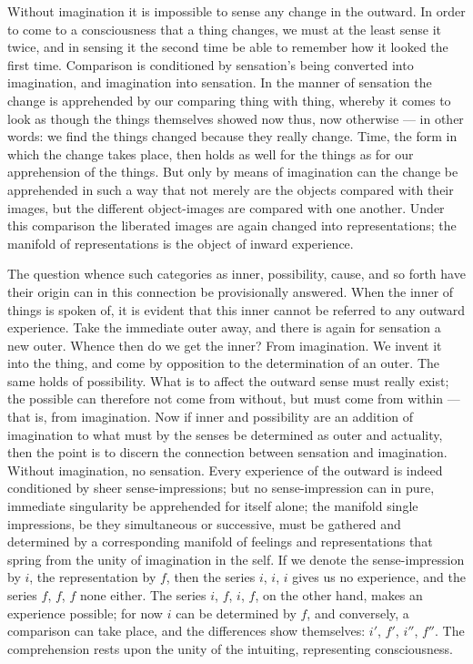 \documentclass[12pt]{book}
\begin{document}
Without imagination it is impossible to sense any change in the outward. In
order to come to a consciousness that a thing changes, we must at the least
sense it twice, and in sensing it the second time be able to remember how it
looked the first time. Comparison is conditioned by sensation's being
converted into imagination, and imagination into sensation. In the manner of
sensation the change is apprehended by our comparing thing with thing, whereby
it comes to look as though the things themselves showed now thus, now
otherwise --- in other words: we find the things changed because they really
change. Time, the form in which the change takes place, then holds as well for
the things as for our apprehension of the things. But only by means of
imagination can the change be apprehended in such a way that not merely are the
objects compared with their images, but the different object-images are
compared with one another. Under this comparison the liberated images are
again changed into representations; the manifold of representations is the
object of inward experience.

The question whence such categories as inner, possibility, cause, and so forth
have their origin can in this connection be provisionally answered. When the
inner of things is spoken of, it is evident that this inner cannot be referred
to any outward experience. Take the immediate outer away, and there is again
for sensation a new outer. Whence then do we get the inner? From imagination.
We invent it into the thing, and come by opposition to the determination of an
outer. The same holds of possibility. What is to affect the outward sense must
really exist; the possible can therefore not come from without, but must come
from within --- that is, from imagination. Now if inner and possibility are an
addition of imagination to what must by the senses be determined as outer and
actuality, then the point is to discern the connection between sensation and
imagination. Without imagination, no sensation. Every experience of the
outward is indeed conditioned by sheer sense-impressions; but no
sense-impression can in pure, immediate singularity be apprehended for itself
alone; the manifold single impressions, be they simultaneous or successive,
must be gathered and determined by a corresponding manifold of feelings and
representations that spring from the unity of imagination in the self. If we
denote the sense-impression by $i$, the representation by $f$, then the series
$i$, $i$, $i$ gives us no experience, and the series $f$, $f$, $f$ none
either. The series $i$, $f$, $i$, $f$, on the other hand, makes an experience
possible; for now $i$ can be determined by $f$, and conversely, a comparison
can take place, and the differences show themselves: $i'$, $f'$, $i''$,
$f''$. The comprehension rests upon the unity of the intuiting,
representing consciousness.
\end{document}
